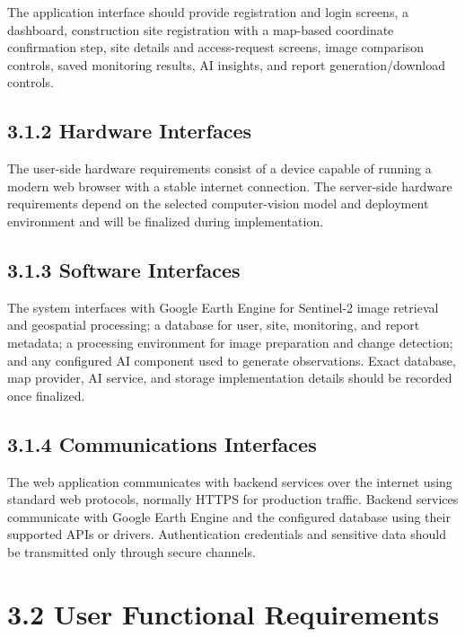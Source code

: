 \documentclass[12pt,a4paper]{report}
\begin{document}
The application interface should provide registration and login screens,
a dashboard, construction site registration with a map-based coordinate
confirmation step, site details and access-request screens, image
comparison controls, saved monitoring results, AI insights, and report
generation/download controls.

\subsection{3.1.2 Hardware Interfaces}\label{hardware-interfaces}

The user-side hardware requirements consist of a device capable of
running a modern web browser with a stable internet connection. The
server-side hardware requirements depend on the selected computer-vision
model and deployment environment and will be finalized during
implementation.

\subsection{3.1.3 Software Interfaces}\label{software-interfaces}

The system interfaces with Google Earth Engine for Sentinel-2 image
retrieval and geospatial processing; a database for user, site,
monitoring, and report metadata; a processing environment for image
preparation and change detection; and any configured AI component used
to generate observations. Exact database, map provider, AI service, and
storage implementation details should be recorded once finalized.

\subsection{3.1.4 Communications
Interfaces}\label{communications-interfaces}

The web application communicates with backend services over the internet
using standard web protocols, normally HTTPS for production traffic.
Backend services communicate with Google Earth Engine and the configured
database using their supported APIs or drivers. Authentication
credentials and sensitive data should be transmitted only through secure
channels.

\section{3.2 User Functional
Requirements}\label{user-functional-requirements}
\end{document}
